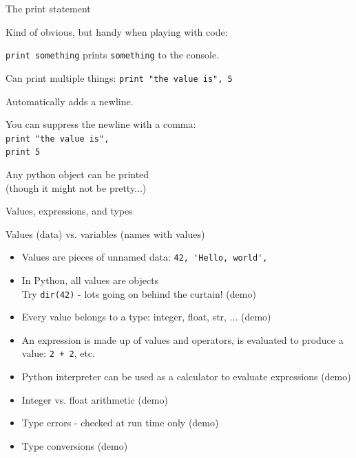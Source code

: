 \documentclass{beamer}
\begin{document}
\begin{frame}[fragile]{The print statement}

{\large
Kind of obvious, but handy when playing with code:

\vfill
\verb|print something| prints \verb|something| to the console.

\vfill
Can print multiple things: \verb|print "the value is", 5|

\vfill
Automatically adds a newline.

\vfill
You can suppress the newline with a comma: \\
\verb|print "the value is",|\\
\verb|print 5|

\vfill
Any python object can be printed\\
(though it might not be pretty...)

}

\end{frame}

\begin{frame}[fragile]{Values, expressions, and types}

{\large Values (data) vs. variables (names with values)}

\begin{itemize}
    \item  Values are pieces of unnamed data: \verb+42, 'Hello, world',+

    \item  In Python, all values are objects\\
      Try \verb+dir(42)+ - lots going on behind the curtain! (demo)

    \item  Every value belongs to a type: integer, float, str, ...  (demo)

    \item  An expression is made up of values and operators, is evaluated to
        produce a value:  \verb!2 + 2!, etc.

    \item  Python interpreter can be used as a calculator to evaluate expressions (demo)

    \item  Integer vs. float arithmetic (demo)

    \item  Type errors - checked at run time only (demo)
  
    \item  Type conversions (demo)
\end{itemize}

\end{frame}
\end{document}
